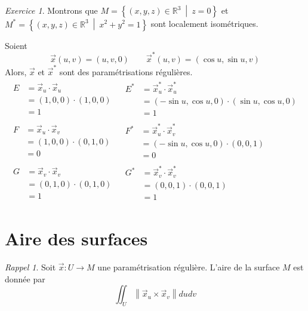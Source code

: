 \documentclass{report}
\theoremstyle{definition}
\theoremstyle{remark}
\newtheorem*{exer}{Exercice}
\newtheorem*{rapp}{Rappel}
\def\RR{\mathbb{R}}
\newcommand*{\norme}[1]{\left\|#1\right\|}
\begin{document}
	\begin{exer}
		Montrons que $M=\left\{ (x,y,z)\in\RR^3 ~\middle|~ z=0 \right\}$ et $M^*=\left\{ (x,y,z)\in\RR^3 ~\middle|~ x^2+y^2=1 \right\}$ sont localement isom\'etriques.

		Soient \[ \vec x(u,v)=(u,v,0) \qquad \vec x^*(u,v)=(\cos u,\sin u,v) \] Alors, $\vec x$ et $\vec x^*$ sont des param\'etrisations r\'eguli\`eres.
		\begin{align*}
			\begin{split}
				E&= \vec x_u \cdot \vec x_u\\
				&= (1,0,0)\cdot(1,0,0)\\
				&= 1
			\end{split}
			&
			\begin{split}
				E^*&= \vec x_u^* \cdot \vec x_u^*\\
				&= (-\sin u,\cos u,0)\cdot(\sin u,\cos u,0)\\
				&= 1
			\end{split}
			\\
			\begin{split}
				F&= \vec x_u \cdot \vec x_v\\
				&= (1,0,0)\cdot(0,1,0)\\
				&= 0
			\end{split}
			&
			\begin{split}
				F^*&= \vec x_u^* \cdot \vec x_v^*\\
				&= (-\sin u,\cos u,0)\cdot(0,0,1)\\
				&= 0
			\end{split}
			\\
			\begin{split}
				G&= \vec x_v \cdot \vec x_v\\
				&= (0,1,0)\cdot(0,1,0)\\
				&= 1
			\end{split}
			&
			\begin{split}
				G^*&= \vec x_v^* \cdot \vec x_v^*\\
				&= (0,0,1)\cdot(0,0,1)\\
				&= 1
			\end{split}
		\end{align*}
	\end{exer}

	\section{Aire des surfaces}
	\begin{rapp}
		Soit $\vec x:U\to M$ une param\'etrisation r\'eguli\`ere. L'aire de la surface $M$ est donn\'ee par \[ \iint_U \norme{\vec x_u \times \vec x_v}dudv \]
	\end{rapp}
\end{document}
